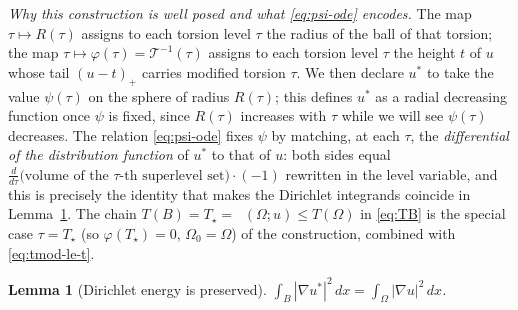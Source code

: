 \documentclass[11pt]{amsart}
\newtheorem{lemma}[theorem]{Lemma}
\theoremstyle{definition}
\newcommand{\Om}{\Omega}
\newcommand{\abs}[1]{\left|#1\right|}
\newcommand{\dx}{\,dx}
\DeclareMathOperator{\Tmod}{T_{\mathrm{mod}}}
\begin{document}
\emph{Why this construction is well posed and what \eqref{eq:psi-ode}
encodes.} The map $\tau\mapsto R(\tau)$ assigns to each torsion level $\tau$
the radius of the ball of that torsion; the map $\tau\mapsto\varphi(\tau)
=\mathcal T^{-1}(\tau)$ assigns to each torsion level $\tau$ the height $t$
of $u$ whose tail $(u-t)_+$ carries modified torsion $\tau$. We then declare
$u^*$ to take the value $\psi(\tau)$ on the sphere of radius $R(\tau)$; this
defines $u^*$ as a radial decreasing function once $\psi$ is fixed, since
$R(\tau)$ increases with $\tau$ while we will see $\psi(\tau)$ decreases.
The relation \eqref{eq:psi-ode} fixes $\psi$ by matching, at each $\tau$, the
\emph{differential of the distribution function} of $u^*$ to that of $u$:
both sides equal $\frac{d}{d\tau}\bigl(\text{volume of the }\tau\text{-th
superlevel set}\bigr)\cdot(-1)$ rewritten in the level variable, and this is
precisely the identity that makes the Dirichlet integrands coincide in
Lemma~\ref{lem:A}. The chain $T(B)=T_\star=\Tmod(\Om;u)\le T(\Om)$ in
\eqref{eq:TB} is the special case $\tau=T_\star$ (so $\varphi(T_\star)=0$,
$\Om_0=\Om$) of the construction, combined with \eqref{eq:tmod-le-t}.

\begin{lemma}[Dirichlet energy is preserved]\label{lem:A}
$\displaystyle\int_B\abs{\nabla u^*}^2\dx=\int_\Om\abs{\nabla u}^2\dx$.
\end{lemma}
\end{document}
